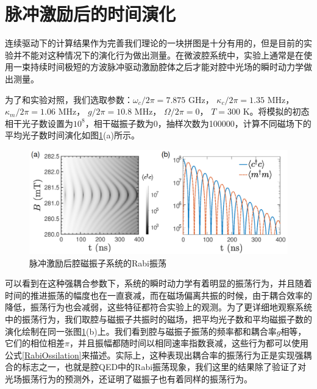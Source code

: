 \section{脉冲激励后的时间演化}
连续驱动下的计算结果作为完善我们理论的一块拼图是十分有用的，但是目前的实验并不能对这种情况下的演化行为做出测量。在微波腔系统中，实验上通常是在使用一束持续时间极短的方波脉冲驱动激励腔体之后才能对腔中光场的瞬时动力学做出测量\cite{PhysRevLett.113.156401Tang,PhysRevB.99.134445Hu}。

为了和实验对照，我们选取参数：$\omega_c/2\pi=7.875$ GHz， $\kappa_c/2\pi=1.35$ MHz， $\kappa_m/2\pi=1.06$ MHz， $g/2\pi=10.8$ MHz， $\Omega/2\pi=0$， $T=300$ K。将模拟的初态相干光子数设置为$10^8$，相干磁振子数为0，抽样次数为100000，计算不同磁场下的平均光子数时间演化如图\ref{Evolution1stOrder}(a)所示。
\begin{figure}[htbp]
	\centering
	\includegraphics[width=2\basefigurewidth,clip]{./figure/5_2}
	\caption{脉冲激励后腔磁振子系统的Rabi振荡} 
	\label{Evolution1stOrder}
\end{figure}
可以看到在这种强耦合参数下，系统的瞬时动力学有着明显的振荡行为，并且随着时间的推进振荡的幅度也在一直衰减，而在磁场偏离共振的时候，由于耦合效率的降低，振荡行为也会减弱，这些特征都符合实验上的观测。为了更详细地观察系统中的振荡行为，我们取腔与磁振子共振时的磁场，把平均光子数和平均磁振子数的演化绘制在同一张图\ref{Evolution1stOrder}(b)上。我们看到腔与磁振子振荡的频率都和耦合率$g$相等，它们的相位相差$\pi$，并且振幅都随时间以相同速率指数衰减，这些行为都可以使用公式\eqref{RabiOssilation}来描述。实际上，这种表现出耦合率的振荡行为正是实现强耦合的标志之一，也就是腔QED中的Rabi振荡现象，我们这里的结果除了验证了对光场振荡行为的预测外，还证明了磁振子也有着同样的振荡行为。

